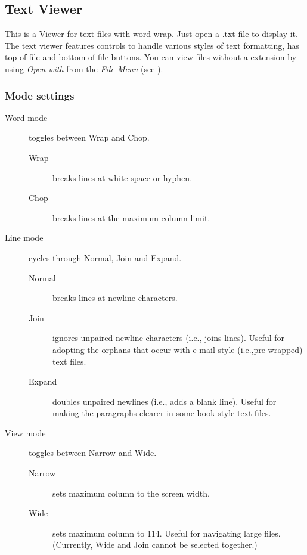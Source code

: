 \subsection{Text Viewer}
This is a Viewer for text files with word wrap. Just open a .txt file to
display it. The text viewer features controls to handle various styles of text
formatting, has top{}-of{}-file and bottom{}-of{}-file buttons. You can view
files without a  extension by using \emph{Open with} from the
\emph{File Menu} (see ).

\subsubsection{Mode settings}

\begin{description}
\item[Word mode] toggles between Wrap and Chop.
    \begin{description}
        \item[Wrap] breaks lines at white space or hyphen.
        \item[Chop] breaks lines at the maximum column limit.
    \end{description}  
\item[Line mode] cycles through Normal, Join and Expand.
    \begin{description}
        \item[Normal] breaks lines at newline characters.
        \item[Join] ignores unpaired newline characters (i.e., joins lines).
        Useful for adopting the orphans that occur with e{}-mail style
        (i.e.,pre{}-wrapped) text files.
        \item[Expand] doubles unpaired newlines (i.e., adds a blank line).
        Useful for making the paragraphs clearer in some book style text files.
    \end{description}
\item[View mode] toggles between Narrow and Wide.
    \begin{description}
        \item[Narrow] sets maximum column to the screen width.
        \item[Wide] sets maximum column to 114. Useful for navigating large files. (Currently, Wide and Join cannot be selected together.)
    \end{description}
\end{description}
